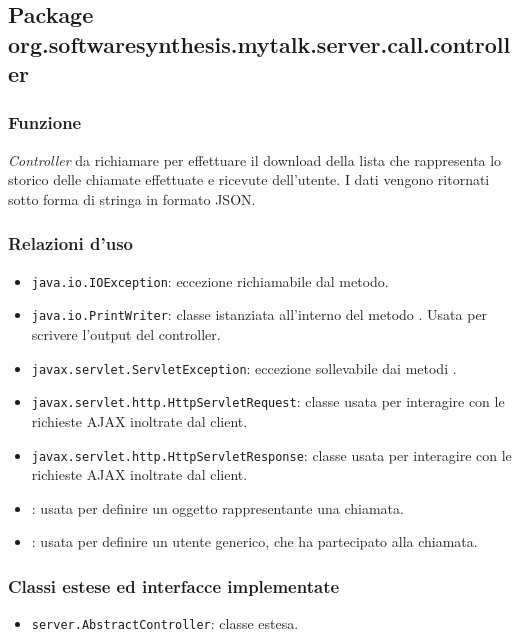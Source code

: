 \subsection{Package org.softwaresynthesis.mytalk.server.call.controller}\label{sec:callServlet}


\subsubsection*{Funzione}
\textit{Controller} da richiamare per effettuare il download della lista che rappresenta lo storico delle chiamate effettuate e ricevute dell'utente. I dati vengono ritornati sotto forma di stringa in formato JSON.

\subsubsection*{Relazioni d'uso}
\begin{itemize}
	\item \texttt{java.io.IOException}: eccezione richiamabile dal metodo.
	\item \texttt{java.io.PrintWriter}: classe istanziata all'interno del metodo . Usata per scrivere l'output del controller.
	\item \texttt{javax.servlet.ServletException}: eccezione sollevabile dai metodi .
	\item \texttt{javax.servlet.http.HttpServletRequest}: classe usata per interagire con le richieste AJAX inoltrate dal client.
	\item \texttt{javax.servlet.http.HttpServletResponse}: classe usata per interagire con le richieste AJAX inoltrate dal client.
	\item {}: usata per definire un oggetto rappresentante una chiamata.
	\item {}: usata per definire un utente generico, che ha partecipato alla chiamata.
\end{itemize}

\subsubsection*{Classi estese ed interfacce implementate}
\begin{itemize}
	\item \texttt{server.AbstractController}: classe estesa.
\end{itemize}

